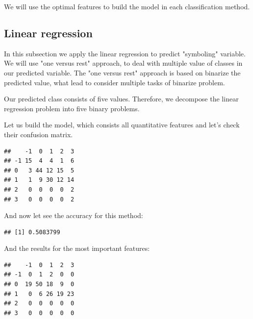 \documentclass[11pt,a4paper]{article}\usepackage[]{graphicx}\usepackage[]{xcolor}
\makeatletter
\newenvironment{kframe}{%
 \def\at@end@of@kframe{}%
 \ifinner\ifhmode%
  \def\at@end@of@kframe{\end{minipage}}%
  \begin{minipage}{\columnwidth}%
 \fi\fi%
 \def\FrameCommand##1{\hskip\@totalleftmargin \hskip-\fboxsep
 \colorbox{shadecolor}{##1}\hskip-\fboxsep
     \hskip-\linewidth \hskip-\@totalleftmargin \hskip\columnwidth}%
 \MakeFramed {\advance\hsize-\width
   \@totalleftmargin\z@ \linewidth\hsize
   \@setminipage}}%
 {\par\unskip\endMakeFramed%
 \at@end@of@kframe}
\newenvironment{knitrout}{}{} %
\makeatother
\begin{document}
We will use the optimal features to build the model in each classification method.


	
	\subsection{Linear regression}\label{sec:linear_regression}
	In this subsection we apply the linear regression to predict "symboling" variable. We will use "one versus rest" approach, to deal with multiple value of classes in our predicted variable. The "one versus rest" approach is based on binarize the predicted value, what lead to consider multiple tasks of binarize problem. 
	
Our predicted class consists of five values. Therefore, we decompose the linear regression problem into five binary problems.
	
	Let us build the model, which consists all quantitative features and let's check their confusion matrix.
	

	
\begin{knitrout}
\color{fgcolor}\begin{kframe}
\begin{verbatim}
##    -1  0  1  2  3
## -1 15  4  4  1  6
## 0   3 44 12 15  5
## 1   1  9 30 12 14
## 2   0  0  0  0  2
## 3   0  0  0  0  2
\end{verbatim}
\end{kframe}
\end{knitrout}
	And now let see the accuracy for this method:
	
\begin{knitrout}
\color{fgcolor}\begin{kframe}
\begin{verbatim}
## [1] 0.5083799
\end{verbatim}
\end{kframe}
\end{knitrout}
	
	And the results for the most important features:
	
\begin{knitrout}
\color{fgcolor}\begin{kframe}
\begin{verbatim}
##    -1  0  1  2  3
## -1  0  1  2  0  0
## 0  19 50 18  9  0
## 1   0  6 26 19 23
## 2   0  0  0  0  0
## 3   0  0  0  0  0
\end{verbatim}
\end{kframe}
\end{knitrout}
\end{document}
